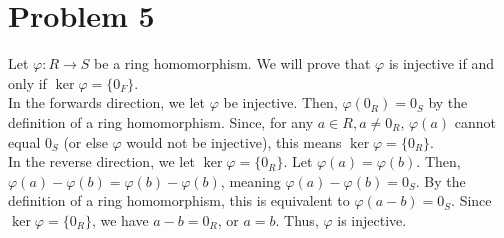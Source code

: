 \documentclass[9pt]{extarticle}
\begin{document}
  \section{Problem 5}%
  Let $\varphi: R\rightarrow S$ be a ring homomorphism. We will prove that $\varphi$ is injective if and only if $\ker \varphi = \{0_F\}$.\\

  In the forwards direction, we let $\varphi$ be injective. Then, $\varphi(0_R) = 0_S$ by the definition of a ring homomorphism. Since, for any $a \in R, a\neq 0_R$, $\varphi(a)$ cannot equal $0_S$ (or else $\varphi$ would not be injective), this means $\ker\varphi = \{0_R\}$.\\

  In the reverse direction, we let $\ker\varphi = \{0_R\}$. Let $\varphi(a) = \varphi(b)$. Then, $\varphi(a) - \varphi(b) = \varphi(b) - \varphi(b)$, meaning $\varphi(a) - \varphi(b) = 0_S$. By the definition of a ring homomorphism, this is equivalent to $\varphi(a-b) = 0_S$. Since $\ker\varphi = \{0_R\}$, we have $a-b = 0_R$, or $a = b$. Thus, $\varphi$ is injective.
\end{document}
